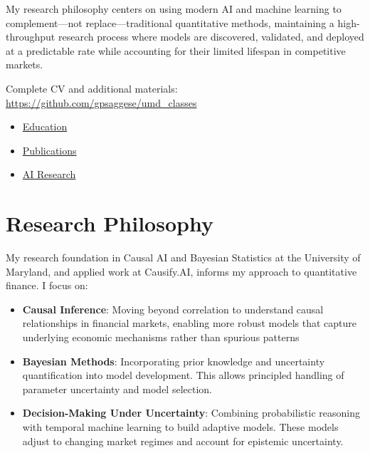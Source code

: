 \documentclass[11pt, letterpaper]{article}
\begin{document}
  My research philosophy centers on using modern AI and machine learning
  to complement---not replace---traditional quantitative methods,
  maintaining a high-throughput research process where models are
  discovered, validated, and deployed at a predictable rate while
  accounting for their limited lifespan in competitive markets.

  Complete CV and additional materials: \href{https://github.com/gpsaggese/umd_classes}{https://github.com/gpsaggese/umd\_classes}

  \begin{itemize}
    \item \href{https://gpsaggese.github.io/03_education/}{Education}

    \item \href{https://gpsaggese.github.io/05_publications/}{Publications}

    \item \href{https://gpsaggese.github.io/06_research/}{AI
      Research}
  \end{itemize}

  \section{Research Philosophy}
  \label{research-philosophy}

  My research foundation in Causal AI and Bayesian Statistics at the
  University of Maryland, and applied work at Causify.AI, informs my
  approach to quantitative finance. I focus on:

  \begin{itemize}
    \item \textbf{Causal Inference}: Moving beyond correlation to understand
      causal relationships in financial markets, enabling more robust
      models that capture underlying economic mechanisms rather than
      spurious patterns

    \item \textbf{Bayesian Methods}: Incorporating prior knowledge and uncertainty
      quantification into model development. This allows principled
      handling of parameter uncertainty and model selection.

    \item \textbf{Decision-Making Under Uncertainty}: Combining probabilistic
      reasoning with temporal machine learning to build adaptive models.
      These models adjust to changing market regimes and account for
      epistemic uncertainty.
  \end{itemize}
\end{document}
